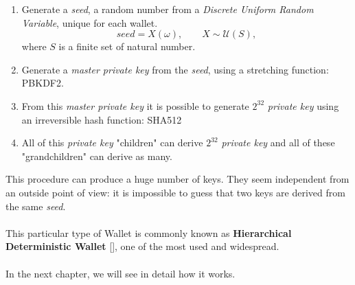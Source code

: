 \begin{enumerate}[label=(\roman*)]
	\item Generate a \textit{seed}, a random number from a \textit{Discrete Uniform Random Variable}, unique for each wallet.
	\begin{equation*}
	seed=X(\omega), \qquad X\sim \mathcal{U}(S),
	\end{equation*}
	where $S$ is a finite set of natural number.
	\item Generate a \textit{master private key} from the \textit{seed}, using a stretching function: PBKDF2.
	\item From this \textit{master private key} it is possible to generate $2^{32}$ \textit{private key} using an irreversible hash function: SHA512
	\item All of this \textit{private key} "children" can derive $2^{32}$ \textit{private key} and all of these "grandchildren" can derive as many.
\end{enumerate}
This procedure can produce a huge number of keys. They seem independent from an outside point of view: it is impossible to guess that two keys are derived from the same \textit{seed}.
\\ \\ 
This particular type of Wallet is commonly known as \textbf{Hierarchical Deterministic Wallet} [\cite{1}], one of the most used and widespread.
\\ \\
In the next chapter, we will see in detail how it works.
